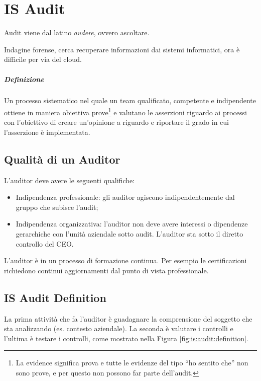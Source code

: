 \chapter{IS Audit}
\label{audit}

Audit viene dal latino \textit{audere}, ovvero ascoltare.

Indagine forense, cerca recuperare informazioni dai sistemi informatici, ora è
difficile per via del cloud.

\paragraph*{Definizione}

Un processo sistematico nel quale un team qualificato, competente e
indipendente ottiene in maniera obiettiva prove\footnote{La evidence significa
prova e tutte le evidenze del tipo ``ho sentito che'' non sono prove, e per
questo non possono far parte dell'audit.} e valutano le asserzioni riguardo ai
processi con l'obiettivo di creare un'opinione a riguardo e riportare il grado
in cui l'asserzione è implementata.


\section{Qualità di un Auditor}

L'auditor deve avere le seguenti qualifiche:
\begin{itemize}
\item Indipendenza professionale: gli auditor agiscono indipendentemente dal
gruppo che subisce l'audit;
\item Indipendenza organizzativa: l'auditor non deve avere interessi o
dipendenze gerarchiche con l'unità aziendale sotto audit. L'auditor sta sotto
il diretto controllo del CEO.
\end{itemize}

L'auditor è in un processo di formazione continua. Per esempio le
certificazioni richiedono continui aggiornamenti dal punto di vista
professionale.

\section{IS Audit Definition}

La prima attività che fa l'auditor è guadagnare la comprensione del soggetto
che sta analizzando (es. contesto aziendale).
La seconda è valutare i controlli e l'ultima è testare i controlli, come
mostrato nella Figura \ref{fig:is:audit:definition}.

